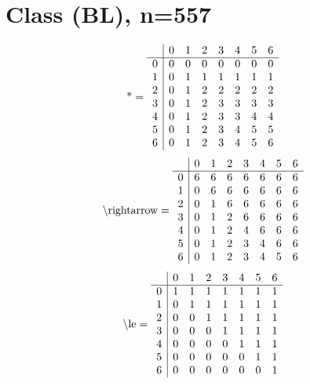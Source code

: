 \documentclass[11pt]{article}
\begin{document}
\section{Class (BL), n=557}
\[\text{*} = 
\begin{array}{r | r r r r r r r}
 & 0 & 1 & 2 & 3 & 4 & 5 & 6 \\ \hline
0 & 0 & 0 & 0 & 0 & 0 & 0 & 0 \\
1 & 0 & 1 & 1 & 1 & 1 & 1 & 1 \\
2 & 0 & 1 & 2 & 2 & 2 & 2 & 2 \\
3 & 0 & 1 & 2 & 3 & 3 & 3 & 3 \\
4 & 0 & 1 & 2 & 3 & 3 & 4 & 4 \\
5 & 0 & 1 & 2 & 3 & 4 & 5 & 5 \\
6 & 0 & 1 & 2 & 3 & 4 & 5 & 6 \\
\end{array}
\]
\[\text{\textbackslash rightarrow} = 
\begin{array}{r | r r r r r r r}
 & 0 & 1 & 2 & 3 & 4 & 5 & 6 \\ \hline
0 & 6 & 6 & 6 & 6 & 6 & 6 & 6 \\
1 & 0 & 6 & 6 & 6 & 6 & 6 & 6 \\
2 & 0 & 1 & 6 & 6 & 6 & 6 & 6 \\
3 & 0 & 1 & 2 & 6 & 6 & 6 & 6 \\
4 & 0 & 1 & 2 & 4 & 6 & 6 & 6 \\
5 & 0 & 1 & 2 & 3 & 4 & 6 & 6 \\
6 & 0 & 1 & 2 & 3 & 4 & 5 & 6 \\
\end{array}
\]
\[\text{\textbackslash le} = 
\begin{array}{r | r r r r r r r}
 & 0 & 1 & 2 & 3 & 4 & 5 & 6 \\ \hline
0 & 1 & 1 & 1 & 1 & 1 & 1 & 1 \\
1 & 0 & 1 & 1 & 1 & 1 & 1 & 1 \\
2 & 0 & 0 & 1 & 1 & 1 & 1 & 1 \\
3 & 0 & 0 & 0 & 1 & 1 & 1 & 1 \\
4 & 0 & 0 & 0 & 0 & 1 & 1 & 1 \\
5 & 0 & 0 & 0 & 0 & 0 & 1 & 1 \\
6 & 0 & 0 & 0 & 0 & 0 & 0 & 1 \\
\end{array}
\]
\end{document}
